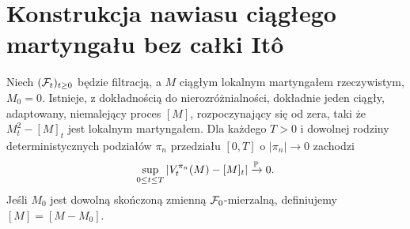 \section{Konstrukcja nawiasu ciągłego martyngału bez całki Itô}
\begin{twierdzenie}
\label{thm:general-bracket}
Niech $(\mathcal{F}_t)_{t\ge0}$ będzie filtracją,
a $M$ ciągłym lokalnym martyngałem rzeczywistym,
$M_0=0$. Istnieje, z dokładnością do nierozróżnialności, dokładnie jeden
ciągły, adaptowany, niemalejący proces $[M]$, rozpoczynający się od zera,
taki że $M_t^2-[M]_t$ jest lokalnym martyngałem.
Dla każdego $T>0$ i dowolnej rodziny deterministycznych
podziałów $\pi_n$ przedziału $[0,T]$ o
$|\pi_n|\to0$ zachodzi
\[
\sup_{0\le t\le T}|V_t^{\pi_n}(M)-[M]_t|
\xrightarrow{\mathbb{P}}0.
\]
Jeśli $M_0$ jest dowolną skończoną zmienną
$\mathcal{F}_0$-mierzalną, definiujemy $[M]=[M-M_0]$.
\end{twierdzenie}
